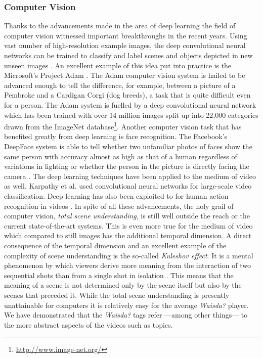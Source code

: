 \subsubsection{Computer Vision}
Thanks to the advancements made in the area of deep learning \cite{Bengio:2013:RLR:2498740.2498889,Arel:2010:RFD:1921914.1921920,Schmidhuber:deep-learning} the field of computer vision witnessed important breakthroughs in the recent years. Using vast number of high-resolution example images, the deep convolutional neural networks can be trained to classify and label scenes and objects depicted in new unseen images \cite{NIPS2012_4824,10.1109/TPAMI.2012.231}. An excellent example of this idea put into practice is the Microsoft's Project Adam \cite{project-adam}. The Adam computer vision system is hailed to be advanced enough to tell the difference, for example, between a picture of a Pembroke and a Cardigan Corgi (dog breeds), a task that is quite difficult even for a person. The Adam system is fuelled by a deep convolutional neural network which has been trained with over 14 million images split up into 22,000 categories drawn from the ImageNet database\footnote{\url{http://www.image-net.org/}}. Another computer vision task that has benefited greatly from deep learning is face recognition. The Facebook's DeepFace system is able to tell whether two unfamiliar photos of faces show the same person with accuracy almost as high as that of a human regardless of variations in lighting or whether the person in the picture is directly facing the camera \cite{Taigman_2014_CVPR,DBLP:conf/cvpr/ZhangPTFB15}. The deep learning techniques have been applied to the medium of video as well. Karpathy et al. used convolutional neural networks for large-scale video classification. Deep learning has also been exploited to for human action recognition in videos \cite{DBLP:journals/corr/SimonyanZ14,Ji:2013:CNN:2412386.2412939}. In spite of all these advancements, the holy grail of computer vision, \textit{total scene understanding}, is still well outside the reach or the current state-of-the-art systems. This is even more true for the medium of video which compared to still images has the additional temporal dimension. A direct consequence of the temporal dimension and an excellent example of the complexity of scene understanding is the so-called \textit{Kuleshov effect}. It is a mental phenomenon by which viewers derive more meaning from the interaction of two sequential shots than from a single shot in isolation \cite{mobbs2006kuleshov}. This means that the meaning of a scene is not determined only by the scene itself but also by the scenes that preceded it. While the total scene understanding is presently unattainable for computers it is relatively easy for the average \textit{Waisda?} player. We have demonstrated that the \textit{Waisda?} tags refer ---among other things--- to the more abstract aspects of the videos such as topics.

